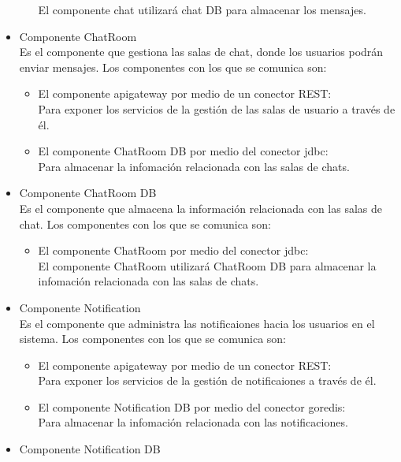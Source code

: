 \begin{itemize}
\begin{itemize}
        El componente chat utilizará chat DB  para almacenar los mensajes.
    \end{itemize}
    \item Componente ChatRoom\\
    Es el componente que gestiona las salas de chat, donde los usuarios podrán enviar mensajes.
    Los componentes con los que se comunica son:
    \begin{itemize}
        \item El componente api\textunderscore gateway por medio de un conector REST:\\
        Para exponer los servicios de la gestión de las salas de usuario a través de él.
        \item El componente ChatRoom DB por medio del conector jdbc:\\
        Para almacenar la infomación relacionada con las salas de chats.
    \end{itemize}
    \item Componente ChatRoom DB\\
    Es el componente que almacena la información relacionada con las salas de chat.
    Los componentes con los que se comunica son:
    \begin{itemize}
        \item El componente ChatRoom por medio del conector jdbc:\\
        El componente ChatRoom utilizará ChatRoom DB para almacenar la infomación relacionada con las salas de chats.
    \end{itemize}
    \item Componente Notification\\
    Es el componente que administra las notificaiones hacia los usuarios en el sistema.
    Los componentes con los que se comunica son:
    \begin{itemize}
        \item El componente api\textunderscore gateway por medio de un conector REST:\\
        Para exponer los servicios de la gestión de notificaiones a través de él.
        \item El componente Notification DB por medio del conector go\textunderscore redis:\\
        Para almacenar la infomación relacionada con las notificaciones.
    \end{itemize}
    \item Componente Notification DB\\

\end{itemize}
